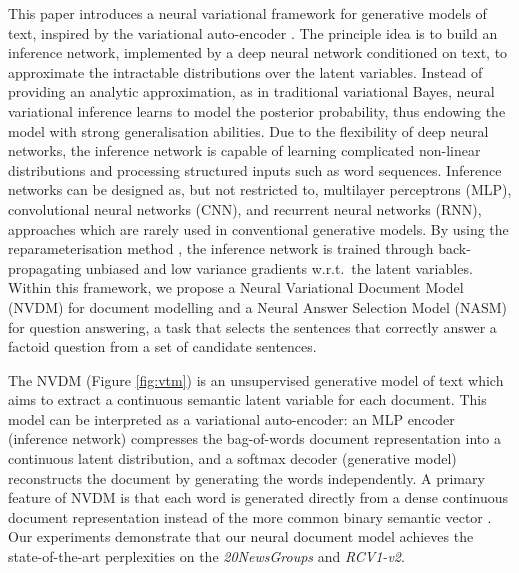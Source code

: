 \documentclass{article}
\begin{document}
This paper introduces a neural variational framework for generative models of text, inspired by the variational auto-encoder \citep{rezende2014stochastic,kingma2013auto}. 
The principle idea is to build an inference network, implemented by a deep neural network conditioned on text, to approximate the intractable distributions over the latent variables. 
Instead of providing an analytic approximation, as in traditional variational Bayes, neural variational inference learns to model the posterior probability, thus endowing the model with strong generalisation abilities. 
Due to the flexibility of deep neural networks, the inference network is capable of learning complicated non-linear distributions and processing structured inputs such as word sequences. 
Inference networks can be designed as, but not restricted to, multilayer perceptrons (MLP), convolutional neural networks (CNN), and recurrent neural networks (RNN), approaches which are rarely used in conventional generative models.
By using the reparameterisation method \citep{rezende2014stochastic,kingma2013auto}, the inference network is trained through back-propagating unbiased and low variance gradients w.r.t.\ the latent variables.
Within this framework, we propose a Neural Variational Document Model (NVDM) for document modelling and a Neural Answer Selection Model (NASM) for question answering, a task that selects the sentences that correctly answer a factoid question from a set of candidate sentences. 



The NVDM (Figure \ref{fig:vtm}) is an unsupervised generative model of text which aims to extract a continuous semantic latent variable for each document. 
This model can be interpreted as a variational auto-encoder: an MLP encoder (inference network) compresses the bag-of-words document representation into a continuous latent distribution, and a softmax decoder (generative model) reconstructs the document by generating the words independently. 
A primary feature of NVDM is that each word is generated directly from a dense continuous document representation instead of the more common binary semantic vector \citep{hinton2009replicated,larochelle2012neural,Srivastava2013,mnih2014neural}.
Our experiments demonstrate that our neural document model achieves the state-of-the-art perplexities on the \textit{20NewsGroups} and \textit{RCV1-v2}.
\end{document}
